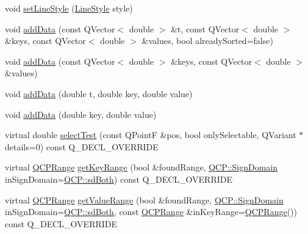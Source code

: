 \begin{DoxyCompactItemize}
\item 
void \hyperlink{class_q_c_p_curve_a4a377ec863ff81a1875c3094a6177c19}{set\+Line\+Style} (\hyperlink{class_q_c_p_curve_a2710e9f79302152cff794c6e16cc01f1}{Line\+Style} style)
\item 
void \hyperlink{class_q_c_p_curve_a73edf394b94f3f24f07518e30565a07f}{add\+Data} (const Q\+Vector$<$ double $>$ \&t, const Q\+Vector$<$ double $>$ \&keys, const Q\+Vector$<$ double $>$ \&values, bool already\+Sorted=false)
\item 
void \hyperlink{class_q_c_p_curve_a6424fa06da1786648c83ad13a0d0aa14}{add\+Data} (const Q\+Vector$<$ double $>$ \&keys, const Q\+Vector$<$ double $>$ \&values)
\item 
void \hyperlink{class_q_c_p_curve_a13398b236f6926014e404eeb5b9f415c}{add\+Data} (double t, double key, double value)
\item 
void \hyperlink{class_q_c_p_curve_ada4762e793cd5707b33f35b8a4b0f8fb}{add\+Data} (double key, double value)
\item 
virtual double \hyperlink{class_q_c_p_curve_a0ed9b7e6b4bc72010d6fcd974af46a8b}{select\+Test} (const Q\+PointF \&pos, bool only\+Selectable, Q\+Variant $\ast$details=0) const Q\+\_\+\+D\+E\+C\+L\+\_\+\+O\+V\+E\+R\+R\+I\+DE
\item 
virtual \hyperlink{class_q_c_p_range}{Q\+C\+P\+Range} \hyperlink{class_q_c_p_curve_a22d09087f78f254731197cc0b8783299}{get\+Key\+Range} (bool \&found\+Range, \hyperlink{namespace_q_c_p_afd50e7cf431af385614987d8553ff8a9}{Q\+C\+P\+::\+Sign\+Domain} in\+Sign\+Domain=\hyperlink{namespace_q_c_p_afd50e7cf431af385614987d8553ff8a9aa38352ef02d51ddfa4399d9551566e24}{Q\+C\+P\+::sd\+Both}) const Q\+\_\+\+D\+E\+C\+L\+\_\+\+O\+V\+E\+R\+R\+I\+DE
\item 
virtual \hyperlink{class_q_c_p_range}{Q\+C\+P\+Range} \hyperlink{class_q_c_p_curve_a8bb8e3b9085f15921dc40483fb025ab2}{get\+Value\+Range} (bool \&found\+Range, \hyperlink{namespace_q_c_p_afd50e7cf431af385614987d8553ff8a9}{Q\+C\+P\+::\+Sign\+Domain} in\+Sign\+Domain=\hyperlink{namespace_q_c_p_afd50e7cf431af385614987d8553ff8a9aa38352ef02d51ddfa4399d9551566e24}{Q\+C\+P\+::sd\+Both}, const \hyperlink{class_q_c_p_range}{Q\+C\+P\+Range} \&in\+Key\+Range=\hyperlink{class_q_c_p_range}{Q\+C\+P\+Range}()) const Q\+\_\+\+D\+E\+C\+L\+\_\+\+O\+V\+E\+R\+R\+I\+DE
\end{DoxyCompactItemize}
